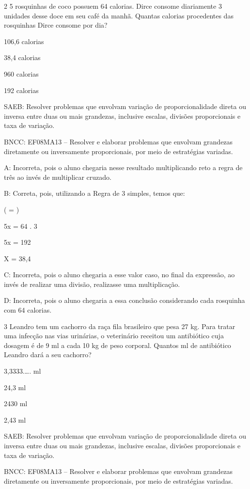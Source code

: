 {\num{2} 5 rosquinhas de coco possuem 64 calorias. Dirce consome diariamente 3
unidades desse doce em seu café da manhã. Quantas calorias procedentes
das rosquinhas Dirce consome por dia?
\item 106,6 calorias
\item 38,4 calorias
\item 960 calorias
\item 192 calorias

SAEB: Resolver problemas que envolvam variação de proporcionalidade
direta ou inversa entre duas ou mais grandezas, inclusive escalas,
divisões proporcionais e taxa de variação.

BNCC: EF08MA13 -- Resolver e elaborar problemas que envolvam grandezas
diretamente ou inversamente proporcionais, por meio de estratégias
variadas.

A: Incorreta, pois o aluno chegaria nesse resultado multiplicando reto a
regra de três ao invés de multiplicar cruzado.

B: Correta, pois, utilizando a Regra de 3 simples, temos que:

( = )

5x = 64 . 3

5x = 192

X = 38,4

C: Incorreta, pois o aluno chegaria a esse valor caso, no final da
expressão, ao invés de realizar uma divisão, realizasse uma
multiplicação.

D: Incorreta, pois o aluno chegaria a essa conclusão considerando cada
rosquinha com 64 calorias.

\num{3} Leandro tem um cachorro da raça fila brasileiro que pesa 27 kg. Para
tratar uma infecção nas vias urinárias, o veterinário receitou um
antibiótico cuja dosagem é de 9 ml a cada 10 kg de peso corporal.
Quantos ml de antibiótico Leandro dará a seu cachorro?
\item 3,3333.\ldots. ml
\item 24,3 ml
\item 2430 ml
\item 2,43 ml

SAEB: Resolver problemas que envolvam variação de proporcionalidade
direta ou inversa entre duas ou mais grandezas, inclusive escalas,
divisões proporcionais e taxa de variação.

BNCC: EF08MA13 -- Resolver e elaborar problemas que envolvam grandezas
diretamente ou inversamente proporcionais, por meio de estratégias
variadas.

}
